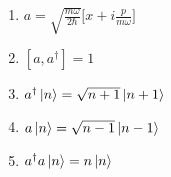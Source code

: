 

\vspace*{\fill}
\centering

\begin{enumerate}
    \item $\displaystyle a = \sqrt{\frac{m\omega}{2\hbar}}\Big[ x + i\frac{p}{m\omega} \Big]$ 
    \item $[a,a^{\dagger}] = 1$
    \item $a^{\dagger}\ket{n} = \sqrt{n+1}\ket{n+1}$
    \item $a\ket{n} = \sqrt{n-1}\ket{n-1}$
    \item $a^{\dagger}a\ket{n} = n\ket{n}$
\end{enumerate}

\centering
\vspace*{\fill}

